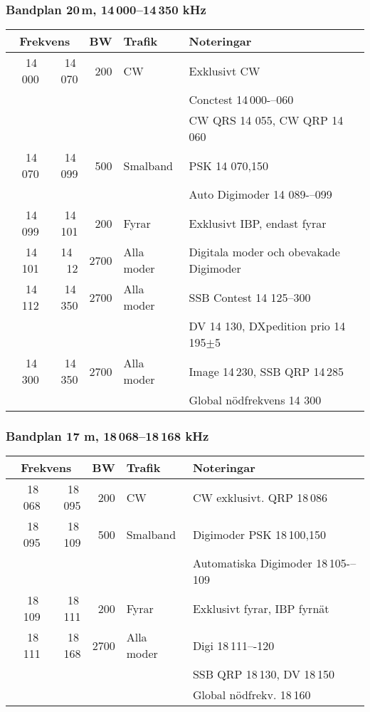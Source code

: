 \subsubsection{Bandplan 20\,m, 14\,000--14\,350 kHz}
\begin{tabular}{rrrll}
\multicolumn{2}{c}{\textbf{Frekvens}} & \textbf{BW} & \textbf{Trafik} & \textbf{Noteringar} \\ \hline
14\,000 & 14\,070 & 200  & CW         & Exklusivt CW                             \\
        &         &      &            & Conctest 14\,000-–060                    \\
        &         &      &            & CW QRS 14 055, CW QRP 14\,060            \\ \hline
14\,070 & 14\,099 & 500  & Smalband   & PSK 14 070,150                           \\
        &         &      &            & Auto Digimoder 14 089-–099               \\ \hline
14\,099 & 14\,101 & 200  & Fyrar      & Exklusivt IBP, endast fyrar              \\ \hline
14\,101 & 14 \,12 & 2700 & Alla moder & Digitala moder och obevakade Digimoder   \\ \hline
14\,112 & 14\,350 & 2700 & Alla moder & SSB Contest 14 125--300                  \\
        &         &      &            & DV 14 130, DXpedition prio 14\,195$\pm$5 \\ \hline
14\,300 & 14\,350 & 2700 & Alla moder & Image 14\,230, SSB QRP 14\,285           \\
        &         &      &            & Global nödfrekvens 14 300                \\ \hline
\end{tabular}

\subsubsection{Bandplan 17 m, 18\,068--18\,168 kHz}
\begin{tabular}{rrrll}
\multicolumn{2}{c}{\textbf{Frekvens}} & \textbf{BW} & \textbf{Trafik} & \textbf{Noteringar} \\ \hline

18\,068 & 18\,095 & 200  & CW         & CW exklusivt. QRP 18\,086             \\ \hline
18\,095 & 18\,109 & 500  & Smalband   & Digimoder PSK 18\,100,150             \\
        &         &      &            & Automatiska Digimoder 18\,105-–109 \\ \hline
18\,109 & 18\,111 & 200  & Fyrar      & Exklusivt fyrar, IBP fyrnät           \\ \hline
18\,111 & 18\,168 & 2700 & Alla moder & Digi 18\,111–-120                   \\
        &         &      &            & SSB QRP 18\,130, DV 18\,150           \\
        &         &      &            & Global nödfrekv. 18\,160              \\ \hline
\end{tabular}

